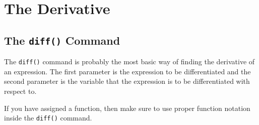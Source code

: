 \chapter{The Derivative}
\label{chp:derivative}			

\section{The \texttt{diff()} Command}
\label{sec:the_diff_command}

The \texttt{diff()} command is probably the most basic way of finding the derivative of an expression. The first parameter is the expression to be differentiated and the second parameter is the variable that the expression is to be differentiated with respect to.
\begin{maplegroup}
\begin{mapleinput}
\end{mapleinput}
\mapleresult
\begin{maplelatex}
\end{maplelatex}
\end{maplegroup}

If you have assigned a function, then make sure to use proper function notation inside the \texttt{diff()} command.

\begin{maplegroup}
\begin{mapleinput}
\end{mapleinput}
\mapleresult
\begin{maplelatex}
\end{maplelatex}
\end{maplegroup}

\begin{maplegroup}
\begin{mapleinput}
\end{mapleinput}
\mapleresult
\begin{maplelatex}
\end{maplelatex}
\end{maplegroup}


